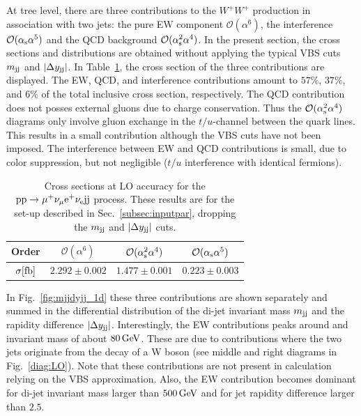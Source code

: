 At tree level, there are three contributions to the $W^+W^+$ production in association with two jets: the pure EW component $\mathcal{O}(\alpha^6)$, the interference $\mathcal{O}(\alpha_\text{s}\alpha^5)$ and the QCD background $\mathcal{O}(\alpha_\text{s}^2\alpha^4)$.
In the present section, the cross sections and distributions are obtained without applying the typical VBS cuts $m_{\text{j}\text{j}}$ and $|\Delta y_{\text{j}\text{j}}|$.
In Table~\ref{tab:LOscanXsec}, the cross section of the three contributions are displayed.
The EW, QCD, and interference contributions amount to $57\%$, $37\%$, and $6\%$ of the total inclusive cross section, respectively.
The QCD contribution does not posses external gluons due to charge conservation.
Thus the $\mathcal{O}(\alpha_\text{s}^2\alpha^4)$ diagrams only involve gluon exchange in the $t/u$-channel between the quark lines.
This results in a small contribution although the VBS cuts have not been imposed.
The interference between EW and QCD contributions is small, due to color suppression, but not negligible ($t/u$ interference with identical fermions).

\begin{table}[h!]
    \centering
    \begin{tabular}{c|c|c|c}
        Order & $ \mathcal{O}(\alpha^6)$ & $\mathcal{O}(\alpha_\text{s}^2\alpha^4)$ & $\mathcal{O}(\alpha_\text{s}\alpha^5)$ \\
        \hline
        \hline
        $\sigma[\rm{fb}]$ & $ 2.292 \pm 0.002 $ & $ 1.477 \pm 0.001 $ & $ 0.223 \pm 0.003 $ \\
    \end{tabular}
    \caption{\label{tab:LOscanXsec} Cross sections at LO accuracy for the ${\rm p}{\rm p}\to\mu^+\nu_\mu{\rm e}^+\nu_{\rm e}{\rm j}{\rm j}$ process.
    These results are for the set-up described in Sec.~\ref{subsec:inputpar}, dropping the $m_{\text{j}\text{j}}$ and $|\Delta y_{\text{j}\text{j}}|$ cuts.}
\end{table}

In Fig.~\ref{fig:mjjdyjj_1d} these three contributions are shown separately and summed in the differential distribution of the di-jet invariant mass $m_{\text{j}\text{j}}$ and the rapidity difference $|\Delta y_{\text{j}\text{j}}|$.
Interestingly, the EW contributions peaks around and invariant mass of about $80\,\text{GeV}$.
These are due to contributions where the two jets originate from the decay of a W boson (see middle and right diagrams in Fig.~\ref{diag:LO}).
Note that these contributions are not present in calculation relying on the VBS approximation.
Also, the EW contribution becomes dominant for di-jet invariant mass larger than $500\,\text{GeV}$ and for jet rapidity difference larger than $2.5$.


